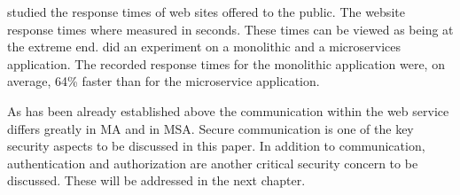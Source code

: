 \begin{sloppypar}
    \citet{webdelays} studied the response times of web sites offered to the
    public. The website response times where measured in seconds. These times
    can be viewed as being at the extreme end. \citet{Johansson_2019} did an
    experiment on a monolithic and a microservices application. The recorded
    response times for the monolithic application were, on average, 64\% faster
    than for the microservice application.
\end{sloppypar}

\begin{sloppypar}
    As has been already established above the communication within the web
    service differs greatly in MA and in MSA. Secure communication is one of the
    key security aspects to be discussed in this paper. In addition to
    communication, authentication and authorization are another critical
    security concern to be discussed. These will be addressed in the next
    chapter.
\end{sloppypar}


